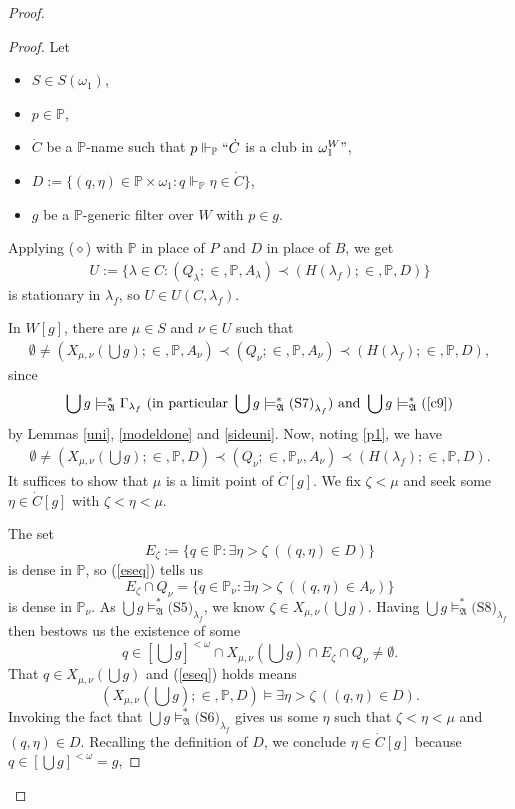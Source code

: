 \documentclass[12pt]{article}
\numberwithin{equation}{section}
\begin{document}
\begin{proof}
\begin{proof}
Let 
\begin{itemize}
    \item $S \in S(\omega_1)$,
    \item $p \in \mathbb{P}$,
    \item $\dot{C}$ be a $\mathbb{P}$-name such that $p \Vdash_{\mathbb{P}} ``\dot{C}$ is a club in $\omega_1^W"$,
    \item $D := \{(q, \eta) \in \mathbb{P} \times \omega_1 : q \Vdash_{\mathbb{P}} \eta \in \dot{C}\}$,
    \item $g$ be a $\mathbb{P}$-generic filter over $W$ with $p \in g$.
\end{itemize}
Applying ($\diamond$) with $\mathbb{P}$ in place of $P$ and $D$ in place of $B$, we get
\begin{align*}
    U := \{\lambda \in C : (Q_{\lambda}; \in, \mathbb{P}, A_{\lambda}) \prec (H(\lambda_f); \in, \mathbb{P}, D)\}
\end{align*}
is stationary in $\lambda_f$, so $U \in U(C, \lambda_f)$.

In $W[g]$, there are $\mu \in S$ and $\nu \in U$ such that 
\begin{align*}
    \emptyset \neq (X_{\mu, \nu}(\bigcup g); \in, \mathbb{P}, A_{\nu}) \prec (Q_{\nu}; \in, \mathbb{P}, A_{\nu}) \prec (H(\lambda_f); \in, \mathbb{P}, D),
\end{align*}
since $$\bigcup g \models^*_{\mathfrak{A}} \Gamma_{\lambda_f} \text{ (in particular } \bigcup g \models^*_{\mathfrak{A}} \text{(S7)}_{\lambda_f} \text{) and } \bigcup g \models^*_{\mathfrak{A}} \text{(}\ref{c9}\text{)}$$ by Lemmas \ref{uni}, \ref{modeldone} and \ref{sideuni}. Now, noting \ref{p1}, we have 
\begin{align}\label{eseq}
    \emptyset \neq (X_{\mu, \nu}(\bigcup g); \in, \mathbb{P}, D) \prec (Q_{\nu}; \in, \mathbb{P}_{\nu}, A_{\nu}) \prec (H(\lambda_f); \in, \mathbb{P}, D).
\end{align}
It suffices to show that $\mu$ is a limit point of $\dot{C}[g]$. We fix $\zeta < \mu$ and seek some $\eta \in \dot{C}[g]$ with $\zeta < \eta < \mu$. 

The set $$E_{\zeta} := \{q \in \mathbb{P} : \exists \eta > \zeta \ ((q, \eta) \in D)\}$$ is dense in $\mathbb{P}$, so (\ref{eseq}) tells us $$E_{\zeta} \cap Q_{\nu} = \{q \in \mathbb{P}_{\nu} : \exists \eta > \zeta \ ((q, \eta) \in A_{\nu})\}$$ is dense in $\mathbb{P}_{\nu}$. As $\bigcup g \models^*_{\mathfrak{A}} \text{(S5)}_{\lambda_f}$, we know $\zeta \in X_{\mu, \nu}(\bigcup g)$. Having $\bigcup g \models^*_{\mathfrak{A}} \text{(S8)}_{\lambda_f}$ then bestows us the existence of some $$q \in [\bigcup g]^{< \omega} \cap X_{\mu, \nu}(\bigcup g) \cap E_{\zeta} \cap Q_{\nu} \neq \emptyset.$$ That $q \in X_{\mu, \nu}(\bigcup g)$ and (\ref{eseq}) holds means $$(X_{\mu, \nu}(\bigcup g); \in, \mathbb{P}, D) \models \exists \eta > \zeta \ ((q, \eta) \in D).$$ Invoking the fact that $\bigcup g \models^*_{\mathfrak{A}} \text{(S6)}_{\lambda_f}$ gives us some $\eta$ such that $\zeta < \eta < \mu$ and $(q, \eta) \in D$. Recalling the definition of $D$, we conclude $\eta \in \dot{C}[g]$ because $q \in [\bigcup g]^{< \omega} = g$, 
\end{proof}


\end{proof}
\end{document}
